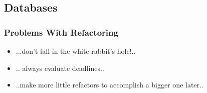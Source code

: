 \documentclass{beamer}
\begin{document}
\subsection{Databases}
\begin{frame}
  \frametitle{Problems With Refactoring} 
  \begin{itemize}
  		\item<+-> ...don't fall in the white rabbit's hole!..
  		\item<+-> .. always evaluate deadlines.. 
  		\item<+-> ..make more little refactors to accomplish a bigger one later..
  \end{itemize}
\end{frame}
\end{document}
